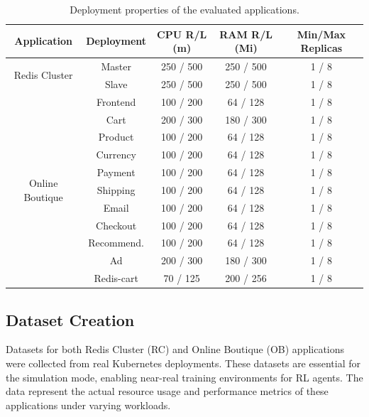 \documentclass[conference]{IEEEtran}
\begin{document}
\begin{table}[h]
    \centering
    \caption{Deployment properties of the evaluated applications.}
    \label{tab:application-deployments}
    \begin{tabular}{|c|c|c|c|c|}
        \hline
        \textbf{Application} & \textbf{Deployment} & \textbf{CPU R/L (m)} & \textbf{RAM R/L (Mi)} & \textbf{Min/Max Replicas} \\
        \hline
        \multirow{2}{*}{Redis Cluster} 
            & Master & 250 / 500 & 250 / 500 & 1 / 8 \\
            & Slave  & 250 / 500 & 250 / 500 & 1 / 8 \\
        \hline
        \multirow{11}{*}{Online Boutique} 
            & Frontend & 100 / 200 & 64 / 128 & 1 / 8 \\
            & Cart     & 200 / 300 & 180 / 300 & 1 / 8 \\
            & Product  & 100 / 200 & 64 / 128 & 1 / 8 \\
            & Currency & 100 / 200 & 64 / 128 & 1 / 8 \\
            & Payment  & 100 / 200 & 64 / 128 & 1 / 8 \\
            & Shipping & 100 / 200 & 64 / 128 & 1 / 8 \\
            & Email    & 100 / 200 & 64 / 128 & 1 / 8 \\
            & Checkout & 100 / 200 & 64 / 128 & 1 / 8 \\
            & Recommend. & 100 / 200 & 64 / 128 & 1 / 8 \\
            & Ad       & 200 / 300 & 180 / 300 & 1 / 8 \\
            & Redis-cart & 70 / 125 & 200 / 256 & 1 / 8 \\
        \hline
    \end{tabular}
\end{table}

\subsection{Dataset Creation}

Datasets for both Redis Cluster (RC) and Online Boutique (OB) applications were collected from real Kubernetes deployments. These datasets are essential for the simulation mode, enabling near-real training environments for RL agents. The data represent the actual resource usage and performance metrics of these applications under varying workloads.
\end{document}
